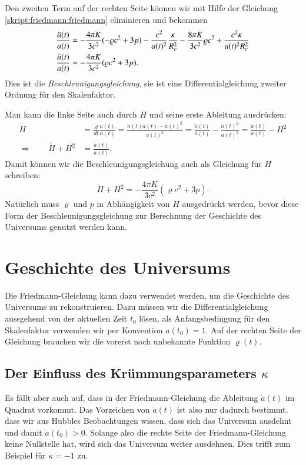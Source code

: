 Den zweiten Term auf der rechten Seite können wir mit Hilfe der Gleichung
\eqref{skript:friedmann:friedmann}
eliminieren und bekommen
\begin{align}
\frac{\ddot a(t)}{a(t)}
&=
-\frac{4\pi K}{3c^2}(-\varrho c^2 + 3p)
-\frac{c^2}{a(t)^2}\frac{\kappa }{R_c^2}
-\frac{8\pi K}{3c^2}\varrho c^2
+
\frac{c^2\kappa }{a(t)^2R_c^2}
\notag
\\
\frac{\ddot a(t)}{a(t)}
&=
-\frac{4\pi K}{3c^2}(\varrho c^2 + 3p).
\label{skript:friedmann:beschleunigung}
\end{align}
Dies ist die {\em Beschleunigungsgleichung}, sie ist eine
Differentialgleichung zweiter Ordnung für den Skalenfaktor.

Man kann die linke Seite auch durch $H$ und seine erste Ableitung
ausdrücken:
\begin{align*}
\dot H
&=
\frac{d}{dt}\frac{\dot a(t)}{a(t)}
=
\frac{\ddot a(t) a(t)-\dot a(t)^2}{a(t)^2}
=
\frac{\ddot a(t)}{a(t)} - \frac{\dot a(t)^2}{a(t)^2}
=
\frac{\ddot a(t)}{a(t)} - H^2
\\
\Rightarrow
\qquad
\dot H+H^2
&=
\frac{\ddot a(t)}{a(t)}.
\end{align*}
Damit können wir die Beschleunigungsgleichung auch als Gleichung
für $H$ schreiben:
\begin{equation}
\dot H+H^2
=
-\frac{4\pi K}{3c^2}(\varrho c^2 + 3p).
\end{equation}
Natürlich muss $\varrho$ und $p$ in Abhängigkeit von $H$ ausgedrückt
werden, bevor diese Form der Beschleunigungsgleichung zur Berechnung
der Geschichte des Universums genutzt werden kann.

\section{Geschichte des Universums}
Die Friedmann-Gleichung kann dazu verwendet werden, um die Geschichte
des Universums zu rekonstruieren.
Dazu müssen wir die Differentialgleichung aussgehend von der
aktuellen Zeit $t_0$ lösen, als Anfangsbedingung für den
Skalenfaktor verwenden wir per Konvention $a(t_0)=1$.
Auf der rechten Seite der Gleichung brauchen wir die vorerst noch
unbekannte Funktion $\varrho(t)$.

\subsection{Der Einfluss des Krümmungsparameters $\kappa$}
Es fällt aber auch auf, dass in der Friedmann-Gleichung die Ableitung
$\dot a(t)$ im Quadrat vorkommt.
Das Vorzeichen von $\dot a(t)$ ist also nur dadurch bestimmt, dass
wir aus Hubbles Beobachtungen wissen, dass sich das Universum
ausdehnt und damit $\dot a(t_0) > 0$.
Solange also die rechte Seite der Friedmann-Gleichung keine Nullstelle
hat, wird sich das Universum weiter ausdehnen.
Dies trifft zum Beispiel für $\kappa=-1$ zu.

